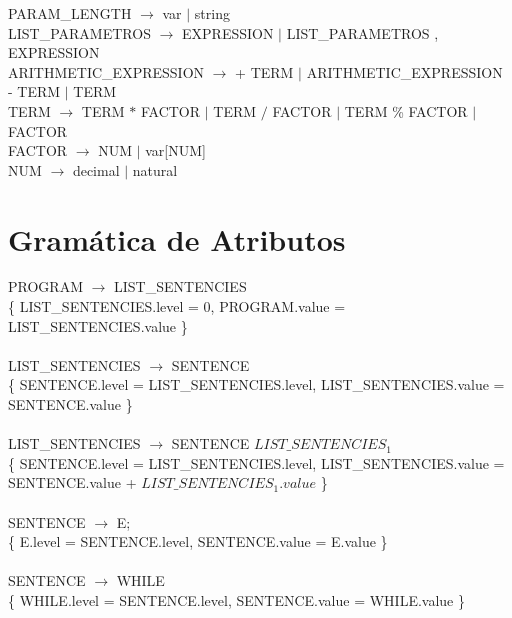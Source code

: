 \documentclass[10pt,a4paper]{article}
\begin{document}
PARAM\_LENGTH $\rightarrow$ var $|$ string \\

LIST\_PARAMETROS $\rightarrow$ EXPRESSION $|$ LIST\_PARAMETROS , EXPRESSION \\

ARITHMETIC\_EXPRESSION $\rightarrow$  + TERM $|$ ARITHMETIC\_EXPRESSION - TERM $|$ TERM \\

TERM $\rightarrow$ TERM $*$ FACTOR $|$ TERM $/$ FACTOR $|$ TERM \% FACTOR $|$ FACTOR \\

FACTOR $\rightarrow$ NUM $|$ var[NUM] \\

NUM $\rightarrow$ decimal $|$ natural


\section{Gramática de Atributos}

PROGRAM $\rightarrow$ LIST\_SENTENCIES \\

\{ LIST\_SENTENCIES.level = 0, PROGRAM.value = LIST\_SENTENCIES.value \} \\ \\


LIST\_SENTENCIES $\rightarrow$ SENTENCE \\

\{ SENTENCE.level = LIST\_SENTENCIES.level, LIST\_SENTENCIES.value = SENTENCE.value \}  \\ \\


LIST\_SENTENCIES $\rightarrow$ SENTENCE  $LIST\_SENTENCIES_{1}$ \\

\{ SENTENCE.level = LIST\_SENTENCIES.level, LIST\_SENTENCIES.value = SENTENCE.value + $LIST\_SENTENCIES_{1}.value$  \} \\  \\


SENTENCE $\rightarrow$  E; \\ 

\{ E.level = SENTENCE.level, SENTENCE.value = E.value \}  \\ \\

SENTENCE $\rightarrow$  WHILE  \\ 

\{ WHILE.level = SENTENCE.level, SENTENCE.value = WHILE.value \}  \\ \\
\end{document}
